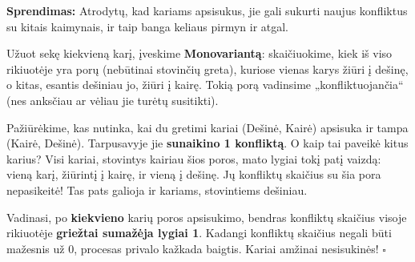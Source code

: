 \documentclass[11pt,a4paper]{scrartcl}
\newenvironment{solution}
    {\begin{list}{}{\setlength{\leftmargin}{10pt}\setlength{\rightmargin}{10pt}}\item[]}
    {\end{list}}
\begin{document}
\begin{solution}
\textbf{Sprendimas:}
Atrodytų, kad kariams apsisukus, jie gali sukurti naujus konfliktus su kitais kaimynais, ir taip banga keliaus pirmyn ir atgal. 

Užuot sekę kiekvieną karį, įveskime \textbf{Monovariantą}: skaičiuokime, kiek iš viso rikiuotėje yra porų (nebūtinai stovinčių greta), kuriose vienas karys žiūri į dešinę, o kitas, esantis dešiniau jo, žiūri į kairę. Tokią porą vadinsime „konfliktuojančia“ (nes anksčiau ar vėliau jie turėtų susitikti).

\begin{center}
\qquad
{}
\end{center}

Pažiūrėkime, kas nutinka, kai du gretimi kariai (Dešinė, Kairė) apsisuka ir tampa (Kairė, Dešinė).
Tarpusavyje jie \textbf{sunaikino 1 konfliktą}. 
O kaip tai paveikė kitus karius? Visi kariai, stovintys kairiau šios poros, mato lygiai tokį patį vaizdą: vieną karį, žiūrintį į kairę, ir vieną į dešinę. Jų konfliktų skaičius su šia pora nepasikeitė! Tas pats galioja ir kariams, stovintiems dešiniau.

Vadinasi, po \textbf{kiekvieno} karių poros apsisukimo, bendras konfliktų skaičius visoje rikiuotėje \textbf{griežtai sumažėja lygiai 1}. 
Kadangi konfliktų skaičius negali būti mažesnis už $0$, procesas privalo kažkada baigtis. Kariai amžinai nesisukinės! \hfill $\square$
\end{solution}
\end{document}
